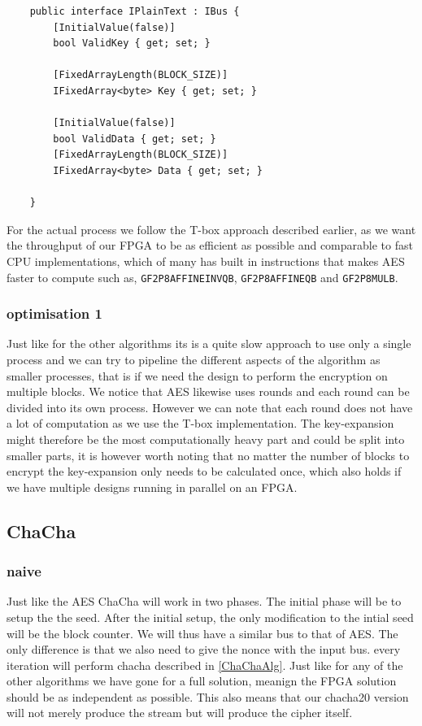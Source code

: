 \documentclass[a4paper]{article}
\begin{document}
\begin{verbatim}
    public interface IPlainText : IBus {
        [InitialValue(false)]
        bool ValidKey { get; set; }

        [FixedArrayLength(BLOCK_SIZE)]
        IFixedArray<byte> Key { get; set; }

        [InitialValue(false)]
        bool ValidData { get; set; }
        [FixedArrayLength(BLOCK_SIZE)]
        IFixedArray<byte> Data { get; set; }

    }
\end{verbatim}
For the actual process we follow the T-box approach described earlier, as we want the throughput of our FPGA to be as efficient as possible and comparable to fast CPU implementations, which of many has built in instructions that makes AES faster to compute such as, \texttt{GF2P8AFFINEINVQB}, \texttt{GF2P8AFFINEQB} and \texttt{GF2P8MULB}.
\subsubsection{optimisation 1}
\label{AESopt}
Just like for the other algorithms its is a quite slow approach to use only a single process and we can try to pipeline the different aspects of the algorithm as smaller processes, that is if we need the design to perform the encryption on multiple blocks. We notice that AES likewise uses rounds and each round can be divided into its own process. However we can note that each round does not have a lot of computation as we use the T-box implementation. The key-expansion might therefore be the most computationally heavy part and could be split into smaller parts, it is however worth noting that no matter the number of blocks to encrypt the key-expansion only needs to be calculated once, which also holds if we have multiple designs running in parallel on an FPGA.
\subsection{ChaCha}
\label{sec:org7ca66a2}

\subsubsection{naive}
\label{ChaChaNaive}
Just like the AES ChaCha will work in two phases. The initial phase will be to setup the the seed. After the initial setup, the only modification to the intial seed will be the block counter. We will thus have a similar bus to that of AES. The only difference is that we also need to give the nonce with the input bus. every iteration will perform chacha described in \ref{ChaChaAlg}. Just like for any of the other algorithms we have gone for a full solution, meanign the FPGA solution should be as independent as possible. This also means that our chacha20 version will not merely produce the stream but will produce the cipher itself.
\end{document}
